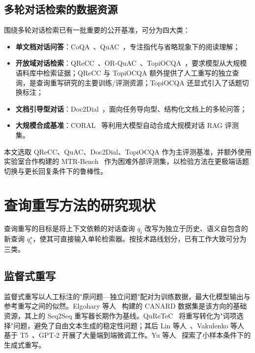 \subsection{多轮对话检索的数据资源}

围绕多轮对话检索已有一批重要的公开基准，可分为四大类：
\begin{itemize}
    \item \textbf{单文档对话问答}：CoQA~\citep{reddy-etal-2019-coqa}、QuAC~\citep{choi-etal-2018-quac}，专注指代与省略现象下的阅读理解；
    \item \textbf{开放域对话检索}：QReCC~\citep{anantha-etal-2021-qrecc}、OR-QuAC~\citep{qu2020orquac}、TopiOCQA~\citep{adlakha-etal-2022-topiocqa}，要求模型从大规模语料库中检索证据；QReCC 与 TopiOCQA 额外提供了人工重写的独立查询，是查询重写研究的主要训练/评测资源；TopiOCQA 还显式引入了话题切换标注；
    \item \textbf{文档引导型对话}：Doc2Dial~\citep{feng-etal-2020-doc2dial}，面向任务导向型、结构化文档上的多轮问答；
    \item \textbf{大规模合成基准}：CORAL~\citep{coral2025} 等利用大模型自动合成大规模对话 RAG 评测集。
\end{itemize}

本文选取 QReCC、QuAC、Doc2Dial、TopiOCQA 作为主评测基准，并额外使用实验室合作构建的 MTR-Bench~\citep{mtrsuite2025} 作为困难外部评测集，以检验方法在更极端话题切换与更长回复条件下的鲁棒性。

\section{查询重写方法的研究现状}
\label{sec:bg_qr}

查询重写的目标是将上下文依赖的对话查询 $q_i$ 改写为独立于历史、语义自包含的新查询 $q_i^\star$，使其可直接输入单轮检索器。按技术路线划分，已有工作大致可分为三类。

\subsection{监督式重写}

监督式重写以人工标注的"原问题—独立问题"配对为训练数据，最大化模型输出与参考重写之间的似然。Elgohary 等人~\citep{elgohary2019canyouunpack} 构建的 CANARD 数据集是该方向的基础资源，其上的 Seq2Seq 重写器长期作为基线。QuReTeC~\citep{voskarides2020quretec} 将重写转化为"词项选择"问题，避免了自由文本生成的稳定性问题；其后 Lin 等人~\citep{lin2020conversational}、Vakulenko 等人~\citep{vakulenko2021question} 基于 T5~\citep{raffel2020t5}、GPT-2 开展了大量端到端微调工作。Yu 等人~\citep{yu2020fewshotgenerative} 探索了小样本条件下的生成式重写。

